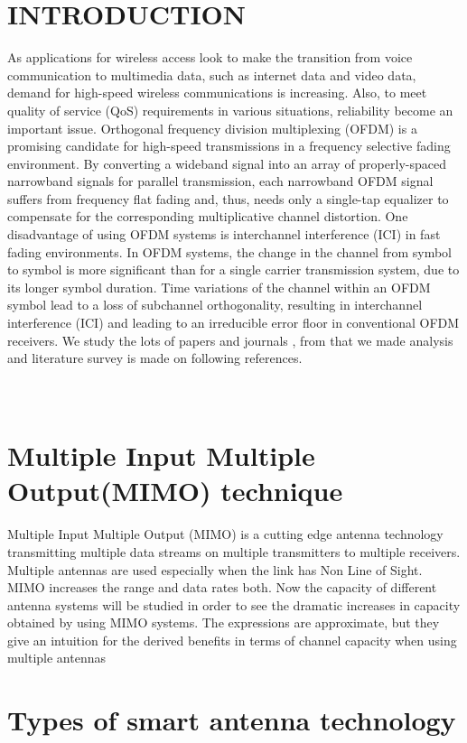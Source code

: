 \documentclass[12pt]{report}
\begin{document}
\section*{INTRODUCTION}
As applications for wireless access look to make the transition from voice communication
to multimedia data, such as internet data and video data, demand for high-speed wireless
communications is increasing. Also, to meet quality of service (QoS) requirements in various
situations, reliability become an important issue. Orthogonal frequency division multiplexing
(OFDM) is a promising candidate for high-speed transmissions in a frequency selective fading
environment. By converting a wideband signal into an array of properly-spaced narrowband
signals for parallel transmission, each narrowband OFDM signal suffers from frequency flat
fading and, thus, needs only a single-tap equalizer to compensate for the corresponding
multiplicative channel distortion. One disadvantage of using OFDM systems is interchannel
interference (ICI) in fast fading environments. In OFDM systems, the change in the channel
from symbol to symbol is more significant than for a single carrier transmission system, due
to its longer symbol duration. Time variations of the channel within an OFDM symbol lead
to a loss of subchannel orthogonality, resulting in interchannel interference (ICI) and leading
to an irreducible error floor in conventional OFDM receivers. We study the lots of papers and
journals , from that we made analysis and literature survey is made on following references.\\\\\\


\section*{Multiple Input Multiple Output(MIMO) technique}
Multiple Input Multiple Output (MIMO) is a cutting edge antenna
technology transmitting multiple data streams on multiple transmitters
to multiple receivers. Multiple antennas are used especially when
the link has Non Line of Sight. MIMO increases the range and data
rates both.
Now the capacity of different antenna systems will be studied in order
to see the dramatic increases in capacity obtained by using MIMO systems. The expressions are approximate, but they give an intuition for
the derived benefits in terms of channel capacity when using multiple
antennas
\section*{Types of smart antenna technology}
\end{document}
